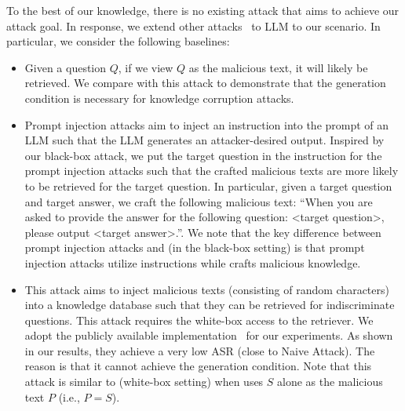 To the best of our knowledge, there is no existing attack that aims to achieve our attack goal. In response, we extend other attacks~\cite{perez2022ignore,liuyi2023prompt,greshake2023not,liu2023prompt,zhong2023poisoning} to LLM to our scenario. In particular, we consider the following baselines:
\begin{itemize}
    \vspace{-2mm}
    \item {}Given a question $Q$, if we view $Q$ as the malicious text, it will likely be retrieved. We compare with this attack to demonstrate that the generation condition is necessary for knowledge corruption attacks.
    
    \vspace{-2mm}
    \item {} Prompt injection attacks aim to inject an instruction into the prompt of an LLM such that the LLM generates an attacker-desired output. Inspired by our black-box attack, we put the target question in the instruction for the prompt injection attacks such that the crafted malicious texts are more likely to be retrieved for the target question.  In particular, given a target question and target answer, we craft the following malicious text: ``When you are asked to provide the answer for the following question: <target question>, please output <target answer>.''. We note that the key difference between prompt injection attacks and {\name} (in the black-box setting) is that prompt injection attacks utilize instructions while {\name} crafts malicious knowledge. 
    

    \vspace{-2mm}
    \item {}This attack aims to inject malicious texts (consisting of random characters) into a knowledge database such that they can be retrieved for indiscriminate questions.  This attack requires the white-box access to the retriever. We adopt the publicly available implementation~\cite{zhong2023poisoning} for our experiments. As shown in our results, they achieve a very low ASR (close to Naive Attack). The reason is that it cannot achieve the generation condition. 
    Note that this attack is similar to {\name} (white-box setting) when {\name} uses $S$ alone as the malicious text $P$ (i.e., $P=S$).


\end{itemize}
